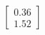 \documentclass[preview]{standalone}
\begin{document}
\begin{align*}
\begin{bmatrix} 0.36 \\ 1.52 \end{bmatrix}
\end{align*}
\end{document}
